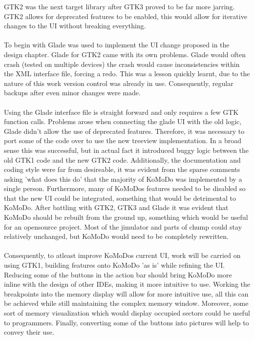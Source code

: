     GTK2 was the next target library after GTK3 proved to be far more jarring. GTK2 allows for deprecated features to be enabled, this would allow for iterative changes to the UI without breaking everything.\\\\
    To begin with Glade was used to implement the UI change proposed in the design chapter. Glade for GTK2 came with its own problems. Glade would often crash (tested on multiple devices) the crash would cause inconsistencies within the XML interface file, forcing a redo. This was a lesson quickly learnt, due to the nature of this work version control was already in use. Consequently, regular backups after even minor changes were made.\\\\
    Using the Glade interface file is straight forward and only requires a few GTK function calls. Problems arose when connecting the glade UI with the old logic, Glade didn't allow the use of deprecated features. Therefore, it was necessary to port some of the code over to use the new treeview implementation. In a broad sense this was successful, but in actual fact it introduced buggy logic between the old GTK1 code and the new GTK2 code. Additionally, the documentation and coding style were far from desireable, it was evident from the sparse comments asking 'what does this do' that the majority of KoMoDo was implemented by a single person. Furthermore, many of KoMoDos features needed to be disabled so that the new UI could be integrated, something that would be detrimental to KoMoDo.
    After battling with GTK2, GTK3 and Glade it was evident that KoMoDo should be rebuilt from the ground up, something which would be useful for an opensource project. Most of the jimulator and parts of chump could stay relatively unchanged, but KoMoDo would need to be completely rewritten.\\\\
    Consequently, to atleast improve KoMoDos current UI, work will be carried on using GTK1, building features onto KoMoDo 'as is' while refining the UI. Reducing some of the buttons in the action bar should bring KoMoDo more inline with the design of other IDEs, making it more intuitive to use. Working the breakpoints into the memory display will allow for more intuitive use, all this can be achieved while still maintaining the complex memory window. Moreover, some sort of memory visualization which would display occupied sectors could be useful to programmers. Finally, converting some of the buttons into pictures will help to convey their use.
